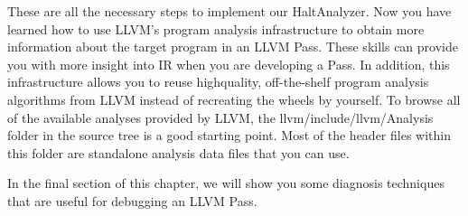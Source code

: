 These are all the necessary steps to implement our HaltAnalyzer. Now you have learned how to use LLVM's program analysis infrastructure to obtain more information about the target program in an LLVM Pass. These skills can provide you with more insight into IR when you are developing a Pass. In addition, this infrastructure allows you to reuse highquality, off-the-shelf program analysis algorithms from LLVM instead of recreating the wheels by yourself. To browse all of the available analyses provided by LLVM, the llvm/include/llvm/Analysis folder in the source tree is a good starting point. Most of the header files within this folder are standalone analysis data files that you can use.

In the final section of this chapter, we will show you some diagnosis techniques that are useful for debugging an LLVM Pass.
























